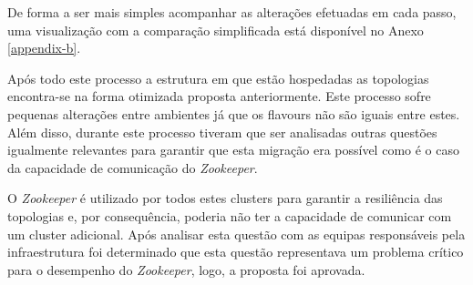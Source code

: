 De forma a ser mais simples acompanhar as alterações efetuadas em cada passo, uma visualização
com a comparação simplificada está disponível no Anexo \ref{appendix-b}.

Após todo este processo a estrutura em que estão hospedadas as topologias encontra-se na forma
otimizada proposta anteriormente. Este processo sofre pequenas alterações entre ambientes já que 
os \glspl{flavour} não são iguais entre estes. Além disso, durante este processo tiveram que ser 
analisadas outras questões igualmente relevantes para garantir que esta migração era possível como 
é o caso da capacidade de comunicação do \textit{Zookeeper}.

O \textit{Zookeeper} é utilizado por todos estes \glspl{cluster} para garantir a resiliência das 
topologias e, por consequência, poderia não ter a capacidade de comunicar com um \gls{cluster}
adicional. Após analisar esta questão com as equipas responsáveis pela infraestrutura foi 
determinado que esta questão representava um problema crítico para o desempenho do 
\textit{Zookeeper}, logo, a proposta foi aprovada.

